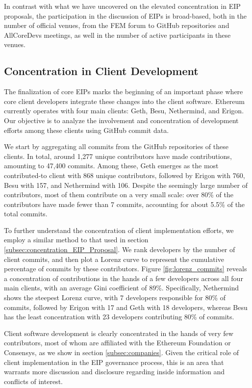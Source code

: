 \documentclass[No]{AEA}
\begin{document}
In contrast with what we have uncovered on the elevated concentration in EIP proposals, the participation in the discussion of EIPs is broad-based, both in the number of official venues, from the FEM forum to GitHub repositories and AllCoreDevs meetings, as well in the number of active participants in these venues. 


\subsection{Concentration in Client Development} \label{subsec:concentration_client_development}


The finalization of core EIPs marks the beginning of an important phase where core client developers integrate these changes into the client software. Ethereum currently operates with four main clients: Geth, Besu, Nethermind, and Erigon. Our objective is to analyze the involvement and concentration of development efforts among these clients using GitHub commit data.

We start by aggregating all commits from the GitHub repositories of these clients. In total, around 1,277 unique contributors have made contributions, amounting to 47,400 commits. Among these, Geth emerges as the most contributed-to client with 868 unique contributors, followed by Erigon with 760, Besu with 157, and Nethermind with 106. Despite the seemingly large number of contributors, most of them contribute on a very small scale: over 80\% of the contributors have made fewer than 7 commits, accounting for about 5.5\% of the total commits. 

To further understand the concentration of client implementation efforts, we employ a similar method to that used in section \ref{subsec:concentration_EIP_Proposal}. We rank developers by the number of client commits, and then plot a Lorenz curve to represent the cumulative percentage of commits by these contributors. Figure \ref{fig:lorenz_commits} reveals a concentration of contributions in the hands of a few developers across all four main clients, with an average Gini coefficient of 89\%. Specifically, Nethermind shows the steepest Lorenz curve, with 7 developers responsible for 80\% of commits, followed by Erigon with 17 and Geth with 18 developers, whereas Besu has the least concentration with 23 developers contributing 80\% of commits. 

Client software development is clearly concentrated in the hands of very few contributors, most of whom are affiliated with the Ethereum Foundation or Consensys, as we show in section \ref{subsec:companies}. Given the critical role of client implementation in the EIP governance process, this is an area that warrants more discussion and disclosure regarding inside information and conflicts of interest. 
\end{document}

